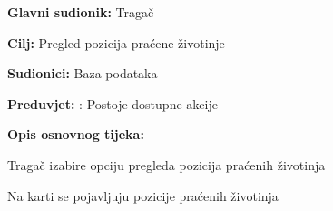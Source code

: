 					\noindent {}
					\begin{packed_item}
	
						\item \textbf{Glavni sudionik: } Tragač
						\item  \textbf{Cilj:} Pregled pozicija praćene životinje
						\item  \textbf{Sudionici:} Baza podataka
						\item  \textbf{Preduvjet:} : Postoje dostupne akcije
						\item  \textbf{Opis osnovnog tijeka:}
						
						\item[] \begin{packed_enum}
	
							\item Tragač izabire opciju pregleda pozicija praćenih životinja
							\item Na karti se pojavljuju pozicije praćenih životinja
							
							
						\end{packed_enum}
					\end{packed_item}
					\noindent {}
